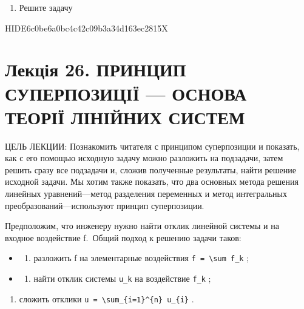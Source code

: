 \documentclass[
  ukrainian,
]{article}
\providecommand{\tightlist}{%
  \setlength{\itemsep}{0pt}\setlength{\parskip}{0pt}}
\begin{document}
\begin{enumerate}
\def\labelenumi{\arabic{enumi}.}
\setcounter{enumi}{5}
\tightlist
\item
  Решите задачу
\end{enumerate}

HIDE6c0be6a0bc4c42c09b3a34d163ec2815X

\section{Лекція 26. ПРИНЦИП СУПЕРПОЗИЦІЇ --- ОСНОВА ТЕОРІЇ ЛІНІЙНИХ
СИСТЕМ}\label{ux43bux435ux43aux446ux456ux44f-26.-ux43fux440ux438ux43dux446ux438ux43f-ux441ux443ux43fux435ux440ux43fux43eux437ux438ux446ux456ux457-ux43eux441ux43dux43eux432ux430-ux442ux435ux43eux440ux456ux457-ux43bux456ux43dux456ux439ux43dux438ux445-ux441ux438ux441ux442ux435ux43c}

ЦЕЛЬ ЛЕКЦИИ: Познакомить читателя с принципом суперпозиции и показать,
как с его помощью исходную задачу можно разложить на подзадачи, затем
решить сразу все подзадачи и, сложив полученные результаты, найти
решение исходной задачи. Мы хотим также показать, что два основных
метода решения линейных уравнений---метод разделения переменных и метод
интегральных преобразований---используют принцип суперпозиции.

Предположим, что инженеру нужно найти отклик линейной системы и на
входное воздействие f.~Общий подход к решению задачи таков:

\begin{itemize}
\tightlist
\item
  \begin{enumerate}
  \def\labelenumi{\arabic{enumi})}
  \tightlist
  \item
    разложить f на элементарные воздействия
    \texttt{f\ =\ \textbackslash{}sum\ f\_k} ;
  \end{enumerate}
\item
  \begin{enumerate}
  \def\labelenumi{\arabic{enumi})}
  \setcounter{enumi}{1}
  \tightlist
  \item
    найти отклик системы \texttt{u\_k} на воздействие \texttt{f\_k} ;
  \end{enumerate}
\end{itemize}

\begin{enumerate}
\def\labelenumi{\arabic{enumi})}
\setcounter{enumi}{2}
\tightlist
\item
  сложить отклики
  \texttt{u\ =\ \textbackslash{}sum\_\{i=1\}\^{}\{n\}\ u\_\{i\}} .
\end{enumerate}
\end{document}

